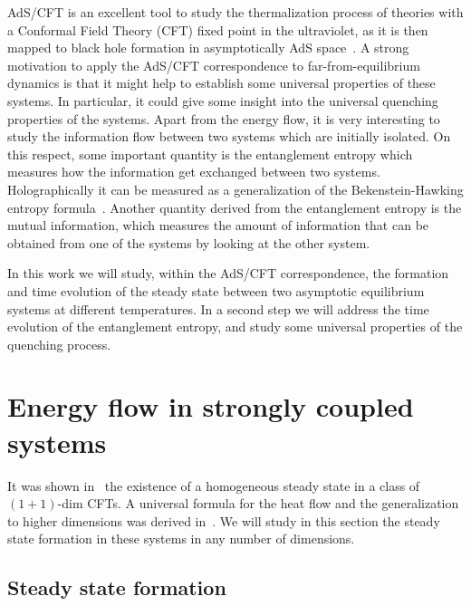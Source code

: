 \documentclass[epj]{webofc}
\begin{document}
AdS/CFT is an excellent tool to study the thermalization process of theories with a Conformal Field Theory (CFT) fixed point in the ultraviolet, as it is then mapped to black hole formation in asymptotically AdS space~\cite{Witten:1998zw}. A strong motivation to apply the AdS/CFT correspondence to far-from-equilibrium dynamics is that it might help to establish some universal properties of these systems. In particular, it could give some insight into the universal quenching properties of the systems. Apart from the energy flow, it is very interesting to study the information flow between two systems which are initially isolated. On this respect, some important quantity is the entanglement entropy which measures how the information get exchanged between two systems. Holographically it can be measured as a generalization of the Bekenstein-Hawking entropy formula~\cite{Ryu:2006bv,Ryu:2006ef,Hubeny:2007xt}. Another quantity derived from the entanglement entropy is the mutual information, which measures the amount of information that can be obtained from one of the systems by looking at the other system.

In this work we will study, within the AdS/CFT correspondence, the formation and time evolution of the steady state between two asymptotic equilibrium systems at different temperatures. In a second step we will address the time evolution of the entanglement entropy, and study some universal properties of the quenching process. 



\section{Energy flow in strongly coupled systems}
\label{sec:energy_flow}

It was shown in~\cite{Bernard:2012je} the existence of a homogeneous steady state in a class of $(1+1)$-dim CFTs. A universal formula for the heat flow and the generalization to higher dimensions was derived in~\cite{Chang:2013gba,Bhaseen:2013ypa}. We will study in this section the steady state formation in these systems in any number of dimensions.


\subsection{Steady state formation}
\label{subsec:steady_state}
\end{document}
